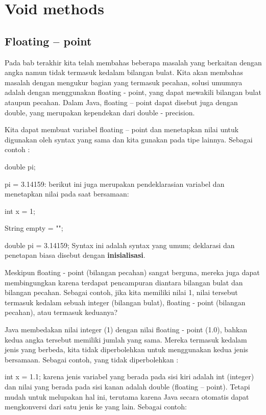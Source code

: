 \chapter{Void methods}
\section{Floating – point}
Pada bab terakhir kita telah membahas beberapa masalah yang berkaitan dengan angka namun tidak termasuk kedalam bilangan bulat. Kita akan membahas masalah dengan mengukur bagian yang termasuk pecahan, solusi umumnya adalah dengan menggunakan floating - point, yang dapat mewakili bilangan bulat ataupun pecahan. Dalam Java, floating – point dapat disebut juga dengan double, yang merupakan kependekan dari double - precision.

Kita dapat membuat variabel floating – point dan menetapkan nilai untuk digunakan oleh syntax yang sama dan kita gunakan pada tipe lainnya. Sebagai contoh :\newline

	double pi;
	
	pi = 3.14159:\newline \newline	
berikut ini juga merupakan pendeklarasian variabel dan menetapkan nilai pada saat bersamaan:\newline

	int x = 1;
	
	String empty = "";
	
	double pi = 3.14159;\newline \newline
Syntax ini adalah syntax yang umum; deklarasi dan penetapan biasa disebut dengan \textbf {inisialisasi}.

Meskipun floating - point (bilangan pecahan) sangat berguna, mereka juga dapat membingungkan karena terdapat pencampuran diantara bilangan bulat dan bilangan pecahan. Sebagai contoh, jika kita memiliki nilai 1, nilai tersebut termasuk kedalam sebuah integer (bilangan bulat), floating - point (bilangan pecahan), atau termasuk keduanya?

Java membedakan nilai integer (1) dengan nilai floating - point (1.0), bahkan kedua angka tersebut memiliki jumlah yang sama. Mereka termasuk kedalam jenis yang berbeda, kita tidak diperbolehkan untuk menggunakan kedua jenis bersamaan. Sebagai contoh, yang tidak diperbolehkan :\newline

	int x = 1.1;\newline \newline
karena jenis variabel yang berada pada sisi kiri adalah int (integer) dan nilai yang berada pada sisi kanan adalah double (floating – point). Tetapi mudah untuk melupakan hal ini, terutama karena Java secara otomatis dapat mengkonversi dari satu jenis ke yang lain. Sebagai contoh:\newline

